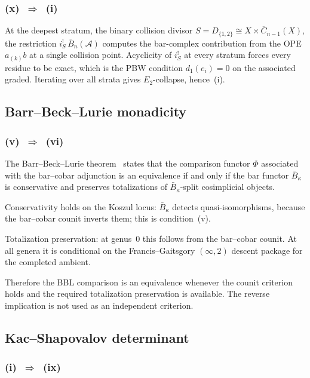 \documentclass[11pt,reqno]{amsart}
\theoremstyle{definition}
\theoremstyle{remark}
\newcommand{\cA}{\mathcal{A}}
\newcommand{\barB}{\bar{B}}
\newcommand{\FM}{\overline{C}}
\numberwithin{equation}{section}
\begin{document}
\subsubsection*{\textup{(x)}~$\Rightarrow$~\textup{(i)}}

At the deepest stratum, the binary collision divisor
$S = D_{\{1,2\}}\cong X\times\FM_{n-1}(X)$, the restriction
$i_S^!\,\barB_n(\cA)$ computes the bar-complex contribution from
the OPE $a_{(k)}b$ at a single collision point. Acyclicity of
$i_S^!$ at every stratum forces every residue to be exact, which
is the PBW condition $d_1(e_i) = 0$ on the associated graded.
Iterating over all strata gives $E_2$-collapse, hence~(i).

\subsection{Barr--Beck--Lurie monadicity}

\subsubsection*{\textup{(v)}~$\Rightarrow$~\textup{(vi)}}

The Barr--Beck--Lurie theorem~\cite[Thm.~4.7.3.5]{HA} states that
the comparison functor $\Phi$ associated with the bar--cobar
adjunction is an equivalence if and only if the bar functor
$\barB_\kappa$ is conservative and preserves totalizations of
$\barB_\kappa$-split cosimplicial objects.

Conservativity holds on the Koszul locus: $\barB_\kappa$ detects
quasi-isomorphisms, because the bar--cobar counit inverts them;
this is condition~\textup{(v)}.

Totalization preservation: at genus~$0$ this follows from the
bar--cobar counit. At all genera it is conditional on the
Francis--Gaitsgory $(\infty,2)$ descent package for the completed
ambient.

Therefore the BBL comparison is an equivalence whenever the counit
criterion holds and the required totalization preservation is
available. The reverse implication is not used as an independent
criterion.

\subsection{Kac--Shapovalov determinant}

\subsubsection*{\textup{(i)}~$\Rightarrow$~\textup{(ix)}}
\end{document}
